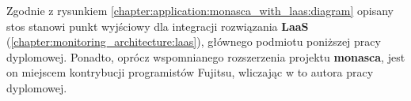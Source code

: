 Zgodnie z rysunkiem \ref{chapter:application:monasca_with_laas:diagram} opisany stos stanowi punkt wyjściowy dla integracji 
rozwiązania \textbf{LaaS} (\ref{chapter:monitoring_architecture:laas}), głównego podmiotu poniższej pracy dyplomowej. 
Ponadto, oprócz wspomnianego rozszerzenia projektu \textbf{monasca}, jest on miejscem kontrybucji programistów Fujitsu, 
wliczając w to autora pracy dyplomowej.


\clearpage 



